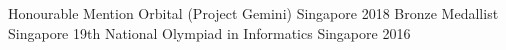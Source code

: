 



\begin{cvhonors}  
  \cvhonor
	{Honourable Mention} %
	{Orbital (Project Gemini)} %
	{Singapore} %
	{2018} %
  \cvhonor
    {Bronze Medallist} %
    {Singapore 19th National Olympiad in Informatics} %
    {Singapore} %
    {2016} %
    
    
 

\end{cvhonors}
